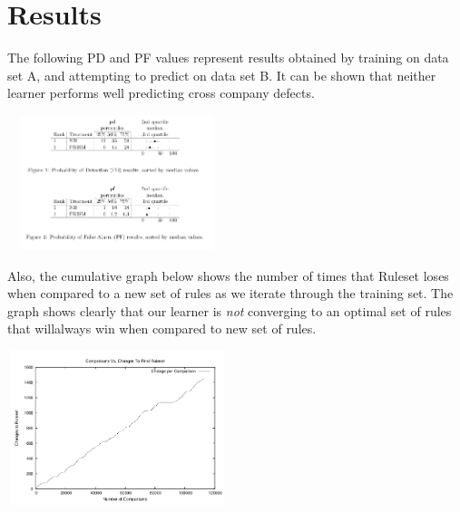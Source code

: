 \documentclass{sig-alternate}
\begin{document}
\section{Results}
The following PD and PF values represent results obtained by training on data set A, and attempting to predict on data set B. It can be shown that neither learner performs well predicting cross company defects.

\includegraphics[width=243, height=149]{pd.png}

Also, the cumulative graph below shows the number of times that Ruleset loses when compared to a new set of rules as we iterate through the training set. The graph shows clearly that our learner is {\em not} converging to an optimal set of rules that willalways win when compared to new set of rules.

\includegraphics[width=243, height=170]{iter.png}
\end{document}

